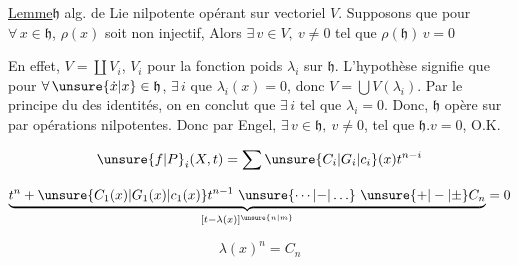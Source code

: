 

\uline{Lemme}\qquad $\mathfrak h$ alg. de Lie nilpotente  opérant sur
vectoriel $V$. Supposons que pour $\forall\,x\in\mathfrak h$, $\rho(x)$
soit non injectif, Alors $\exists\,v\in V,\ v\ne0$ tel que
$\rho(\mathfrak h)\,v=0$

En effet, $V=\coprod V_i$, $V_i$  pour la
fonction poids $\lambda_i$ sur $\mathfrak h$. L'hypothèse signifie
que pour $\forall\,\unsure{\dot x|x}\in\mathfrak h$, $\exists\,i$  que $\lambda_i(x)=0$,
donc $V=\bigcup V(\lambda_i)$. Par le principe du
 des identités, on en conclut que
$\exists\,i$ tel que $\lambda_i=0$. Donc, $\mathfrak h$ opère sur 
 par opérations nilpotentes. Donc
par Engel, $\exists\,v\in\mathfrak h,\ v\ne0$, tel que $\mathfrak h.v=0$, O.K.

\[
\unsure{f|P}_i(X,t)=\sum\unsure{C_i|G_i|c_i}(x)t^{n-i}
\]

\[
\underbrace{t^{n}+\unsure{C_1(x)|G_1(x)|c_1(x)}t^{n-1}\ \unsure{\cdots|{-}|\ldots}\ \unsure{+|-|\pm}C_n}_{[t-\lambda(x)]^{\unsure{n|m}}}=0
\]

\[
\lambda(x)^n=C_n
\]

